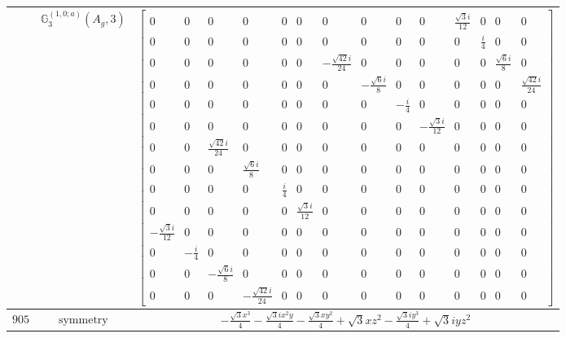 \documentclass[fleqn,8pt,landscape]{jsarticle}
\begin{document}
\begin{longtable}{ccc}
$  $ & $ \mathbb{G}_{3}^{(1,0;a)}(A_{g},3) $ & $ \begin{bmatrix} 0 & 0 & 0 & 0 & 0 & 0 & 0 & 0 & 0 & 0 & \frac{\sqrt{3} i}{12} & 0 & 0 & 0 \\ 0 & 0 & 0 & 0 & 0 & 0 & 0 & 0 & 0 & 0 & 0 & \frac{i}{4} & 0 & 0 \\ 0 & 0 & 0 & 0 & 0 & 0 & - \frac{\sqrt{42} i}{24} & 0 & 0 & 0 & 0 & 0 & \frac{\sqrt{6} i}{8} & 0 \\ 0 & 0 & 0 & 0 & 0 & 0 & 0 & - \frac{\sqrt{6} i}{8} & 0 & 0 & 0 & 0 & 0 & \frac{\sqrt{42} i}{24} \\ 0 & 0 & 0 & 0 & 0 & 0 & 0 & 0 & - \frac{i}{4} & 0 & 0 & 0 & 0 & 0 \\ 0 & 0 & 0 & 0 & 0 & 0 & 0 & 0 & 0 & - \frac{\sqrt{3} i}{12} & 0 & 0 & 0 & 0 \\ 0 & 0 & \frac{\sqrt{42} i}{24} & 0 & 0 & 0 & 0 & 0 & 0 & 0 & 0 & 0 & 0 & 0 \\ 0 & 0 & 0 & \frac{\sqrt{6} i}{8} & 0 & 0 & 0 & 0 & 0 & 0 & 0 & 0 & 0 & 0 \\ 0 & 0 & 0 & 0 & \frac{i}{4} & 0 & 0 & 0 & 0 & 0 & 0 & 0 & 0 & 0 \\ 0 & 0 & 0 & 0 & 0 & \frac{\sqrt{3} i}{12} & 0 & 0 & 0 & 0 & 0 & 0 & 0 & 0 \\ - \frac{\sqrt{3} i}{12} & 0 & 0 & 0 & 0 & 0 & 0 & 0 & 0 & 0 & 0 & 0 & 0 & 0 \\ 0 & - \frac{i}{4} & 0 & 0 & 0 & 0 & 0 & 0 & 0 & 0 & 0 & 0 & 0 & 0 \\ 0 & 0 & - \frac{\sqrt{6} i}{8} & 0 & 0 & 0 & 0 & 0 & 0 & 0 & 0 & 0 & 0 & 0 \\ 0 & 0 & 0 & - \frac{\sqrt{42} i}{24} & 0 & 0 & 0 & 0 & 0 & 0 & 0 & 0 & 0 & 0 \end{bmatrix} $ \\ \hline
$ 905 $ & $ \text{symmetry} $ & $ - \frac{\sqrt{3} x^{3}}{4} - \frac{\sqrt{3} i x^{2} y}{4} - \frac{\sqrt{3} x y^{2}}{4} + \sqrt{3} x z^{2} - \frac{\sqrt{3} i y^{3}}{4} + \sqrt{3} i y z^{2} $ \\

\end{longtable}
\end{document}
